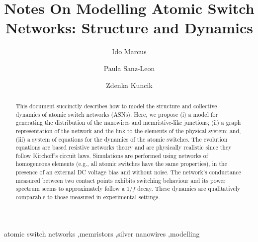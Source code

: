 \documentclass[preprint,10pt, authoryear, a4]{elsarticle}
\begin{document}
\begin{frontmatter}
 


\title{Notes On Modelling Atomic Switch Networks: Structure and Dynamics}



\author[a]{Ido Marcus}
\author[b]{Paula Sanz-Leon}
\author[b]{Zdenka Kuncik}

\address[a]{Weizmann Institute of Science, Rehovot, 7610001, Israel}
\address[b]{School of Physics, University of Sydney, NSW 2006, Australia}


\begin{abstract}
This document succinctly describes how to model the structure and collective
dynamics of atomic switch networks (ASNs). Here, we propose (i) a model for
generating the distribution of the nanowires and memristive-like junctions;
(ii) a graph representation of the network and the link to the elements of the
physical system; and, (iii) a system of equations for the dynamics of the
atomic switches. The evolution equations are based resistive networks theory
and are physically realistic since they follow Kirchoff's circuit laws.
Simulations are performed using networks of homogeneous elements (e.g., all
atomic switches have the same properties), in the presence of an external DC
voltage bias and without noise.  The network's conductance measured between
two contact points exhibits switching behaviour and its power spectrum seems
to approximately follow a $1/f$ decay. These dynamics are qualitatively
comparable to those measured in experimental settings.
\end{abstract}

\begin{keyword}
atomic switch networks \sep memristors \sep silver nanowires \sep modelling
\end{keyword}

\end{frontmatter}
\end{document}
